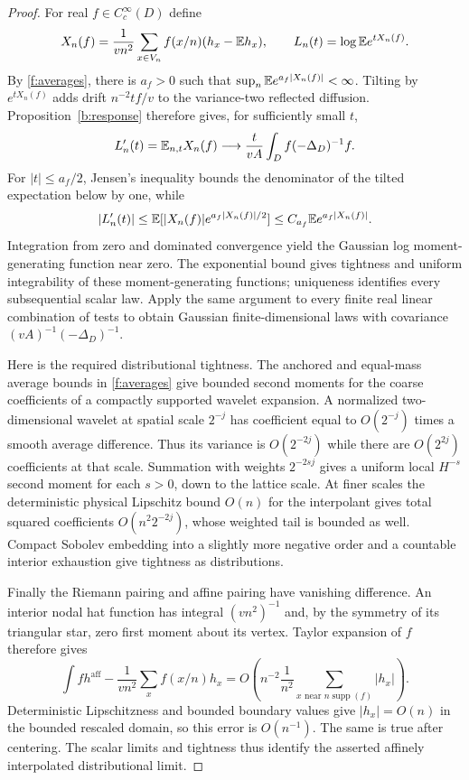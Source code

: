 \begin{proof}
For real $f\in C_c^\infty(D)$ define
\[
 X_n(f)=\frac1{vn^2}\sum_{x\in V_n}
             f(x/n)(h_x-\mathbb E h_x),
 \qquad L_n(t)=\log\mathbb E e^{tX_n(f)}.
\]
By \ref{f:averages}, there is $a_f>0$ such that
$\sup_n\mathbb E e^{a_f|X_n(f)|}<\infty$. Tilting by $e^{tX_n(f)}$
adds drift $n^{-2}tf/v$ to the variance-two reflected diffusion.
Proposition~\ref{b:response} therefore gives, for sufficiently small $t$,
\[
 L_n'(t)=\mathbb E_{n,t}X_n(f)
 \longrightarrow \frac{t}{vA}\int_D f(-\Delta_D)^{-1}f.
\]
For $|t|\le a_f/2$, Jensen's inequality bounds the denominator of the
tilted expectation below by one, while
\[
 |L_n'(t)|\le\mathbb E[|X_n(f)|e^{a_f|X_n(f)|/2}]
             \le C_{a_f}\mathbb E e^{a_f|X_n(f)|}.
\]
Integration from zero and dominated convergence yield the Gaussian log
moment-generating function near zero. The exponential bound gives
tightness and uniform integrability of these moment-generating functions;
uniqueness identifies every subsequential scalar law. Apply the same
argument to every finite real linear combination of tests to obtain
Gaussian finite-dimensional laws with covariance
$(vA)^{-1}(-\Delta_D)^{-1}$.

Here is the required distributional tightness. The anchored and
equal-mass average bounds in \ref{f:averages} give bounded second moments
for the coarse coefficients of a compactly supported wavelet expansion.
A normalized two-dimensional wavelet at spatial scale $2^{-j}$ has
coefficient equal to $O(2^{-j})$ times a smooth average difference.
Thus its variance is $O(2^{-2j})$ while there are $O(2^{2j})$
coefficients at that scale. Summation with weights $2^{-2sj}$ gives
a uniform local $H^{-s}$ second moment for each $s>0$, down to the
lattice scale. At finer scales the deterministic physical Lipschitz
bound $O(n)$ for the interpolant gives total squared coefficients
$O(n^2 2^{-2j})$, whose weighted tail is bounded as well. Compact
Sobolev embedding into a slightly more negative order and a countable
interior exhaustion give tightness as distributions.

Finally the Riemann pairing and affine pairing have vanishing difference.
An interior nodal hat function has integral $(vn^2)^{-1}$ and, by the
symmetry of its triangular star, zero first moment about its vertex.
Taylor expansion of $f$ therefore gives
\[
 \int f h^{\mathrm{aff}}-\frac1{vn^2}\sum_xf(x/n)h_x
 =O\!\left(n^{-2}\frac1{n^2}
                 \sum_{x\text{ near }n\operatorname{supp}(f)}|h_x|\right).
\]
Deterministic Lipschitzness and bounded boundary values give
$|h_x|=O(n)$ in the bounded rescaled domain, so this error is $O(n^{-1})$.
The same is true after centering. The scalar limits and tightness thus
identify the asserted affinely interpolated distributional limit.
\end{proof}
